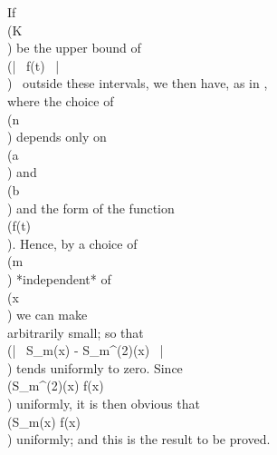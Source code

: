 If \\(K\\) be the upper bound of \\(\left| \, f(t) \, \right| \\) \ outside these intervals, we then
have, as in ,
\\[ 
\left| \, 
  S_{m}(x) - S_{m}^{(2)}(x)
 \, \right| 
<
\left(
  \frac{2nK}{2m + 1} + 2\eps
\right)
\cosec \delta,
\\] 
where the choice of \\(n\\) depends only on \\(a\\) and \\(b\\) and the form of the
function \\(f(t)\\). Hence, by a choice of \\(m\\) *independent* of \\(x\\) we can make
\\[ 
\left| \, 
  S_{m}(x) - S_{m}^{(2)}(x)
 \, \right| 
\\] 
arbitrarily small; so that \\(\left| \, S_{m}(x) - S_{m}^{(2)}(x) \, \right| \\)
tends uniformly to zero. Since
\\(S_{m}^{(2)}(x) \rightarrow f(x)\\)
uniformly, it is then obvious that
\\(S_{m}(x) \rightarrow f(x)\\)
uniformly; and this is the result to be proved.

